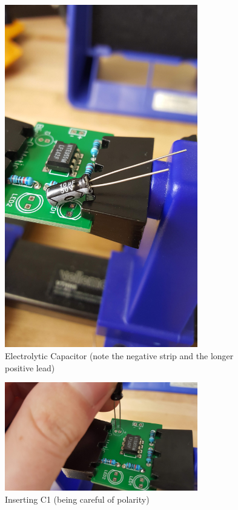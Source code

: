 \documentclass{article}
\begin{document}
\begin{enumerate}
\begin{figure}[H]
\caption{ Electrolytic Capacitor (note the negative strip and the longer positive lead) }
\label{fig:img/0035.jpg}
\centering
\includegraphics[width=0.75\textwidth]{img/0035.jpg}
\end{figure}

      
\begin{figure}[H]
\caption{ Inserting C1 (being careful of polarity) }
\label{fig:img/0040.jpg}
\centering
\includegraphics[width=0.75\textwidth]{img/0040.jpg}
\end{figure}


\end{enumerate}
\end{document}
